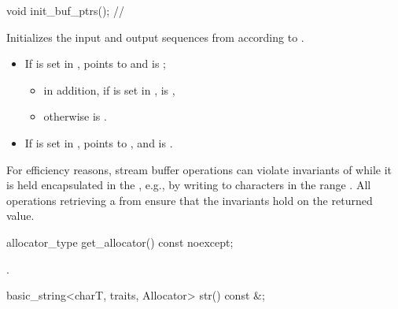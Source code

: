 \begin{itemdecl}
void init_buf_ptrs(); // \expos
\end{itemdecl}

\begin{itemdescr}
\pnum
\effects
Initializes the input and output sequences from 
according to .

\pnum
\ensures
\begin{itemize}
\item If  is set in ,
   points to  and
   is ;
  \begin{itemize}
  \item in addition, if  is set in ,
     is ,
  \item otherwise  is .
  \end{itemize}
\item If  is set in ,
   points to , and
  is .
\end{itemize}

\pnum
\begin{note}
For efficiency reasons,
stream buffer operations can violate invariants of 
while it is held encapsulated in the ,
e.g., by writing to characters in the range
.
All operations retrieving a  from 
ensure that the  invariants hold on the returned value.
\end{note}
\end{itemdescr}

%
\begin{itemdecl}
allocator_type get_allocator() const noexcept;
\end{itemdecl}

\begin{itemdescr}
\pnum
\returns
{}.
\end{itemdescr}

%
\begin{itemdecl}
basic_string<charT, traits, Allocator> str() const &;
\end{itemdecl}

